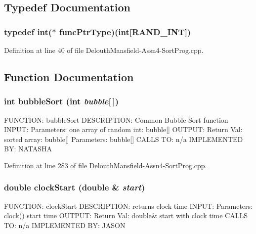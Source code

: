 \subsection{Typedef Documentation}
\hypertarget{_delouth_mansfield-_assn4-_sort_prog_8cpp_ae2987d0004dea58df8c833858c0fb370}{
\subsubsection[{funcPtrType}]{\setlength{\rightskip}{0pt plus 5cm}typedef int($\ast$ {\bf funcPtrType})(int\mbox{[}{\bf RAND\_\-INT}\mbox{]})}}
\label{_delouth_mansfield-_assn4-_sort_prog_8cpp_ae2987d0004dea58df8c833858c0fb370}


Definition at line 40 of file DelouthMansfield-\/Assn4-\/SortProg.cpp.



\subsection{Function Documentation}
\hypertarget{_delouth_mansfield-_assn4-_sort_prog_8cpp_a8bb793ac49cd588089713622d18a8c5b}{
\subsubsection[{bubbleSort}]{\setlength{\rightskip}{0pt plus 5cm}int bubbleSort (int {\em bubble}\mbox{[}$\,$\mbox{]})}}
\label{_delouth_mansfield-_assn4-_sort_prog_8cpp_a8bb793ac49cd588089713622d18a8c5b}
FUNCTION: bubbleSort DESCRIPTION: Common Bubble Sort function INPUT: Parameters: one array of random int: bubble\mbox{[}\mbox{]} OUTPUT: Return Val: sorted array: bubble\mbox{[}\mbox{]} Parameters: bubble\mbox{[}\mbox{]} CALLS TO: n/a IMPLEMENTED BY: NATASHA 

Definition at line 283 of file DelouthMansfield-\/Assn4-\/SortProg.cpp.

\hypertarget{_delouth_mansfield-_assn4-_sort_prog_8cpp_a97da3b77b5ebacff9297f22e54185c1a}{
\subsubsection[{clockStart}]{\setlength{\rightskip}{0pt plus 5cm}double clockStart (double \& {\em start})}}
\label{_delouth_mansfield-_assn4-_sort_prog_8cpp_a97da3b77b5ebacff9297f22e54185c1a}
FUNCTION: clockStart DESCRIPTION: returns clock time INPUT: Parameters: clock() start time OUTPUT: Return Val: double\& start with clock time CALLS TO: n/a IMPLEMENTED BY: JASON 


